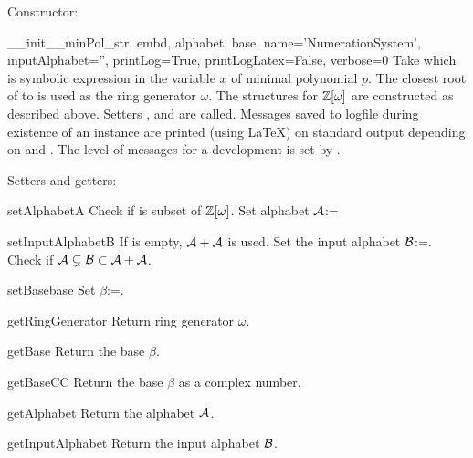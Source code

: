 Constructor:

\begin{method}{\_\_init\_\_}{minPol\_str, embd, alphabet, base, name='NumerationSystem', inputAlphabet='', printLog=True, printLogLatex=False, verbose=0}
Take  which is symbolic expression in the variable $x$ of minimal polynomial $p$. The closest root of   to  is used as the ring generator $\omega$. The structures for $\mathbb{Z}[\omega]$ are constructed as described above. Setters ,  and  are called. Messages saved to logfile during existence of an instance are printed (using \LaTeX) on standard output depending on  and . The level of messages for a development is set by . 
\end{method}

Setters and getters:

\begin{method}{setAlphabet}{A}
Check if  is subset of $\mathbb{Z}[\omega]$. Set alphabet $\mathcal{A}$:=
\end{method}

\begin{method}{setInputAlphabet}{B}
If  is empty, $\mathcal{A}+\mathcal{A}$ is used. Set the input alphabet $\mathcal{B}$:=. Check if $\mathcal{A}\subsetneq\mathcal{B}\subset\mathcal{A}+\mathcal{A}$. 
\end{method}

\begin{method}{setBase}{base}
Set $\beta$:=.
\end{method}

\begin{method}{getRingGenerator}{}
Return ring generator $\omega$.
\end{method}

\begin{method}{getBase}{}
Return the base $\beta$.
\end{method}

\begin{method}{getBaseCC}{}
Return the base $\beta$ as a complex number.
\end{method}

\begin{method}{getAlphabet}{}
Return the alphabet $\mathcal{A}$.
\end{method}

\begin{method}{getInputAlphabet}{}
Return the input alphabet $\mathcal{B}$.
\end{method}

